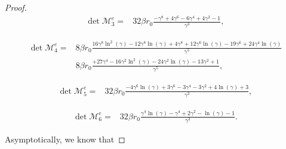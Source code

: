 \documentclass[11pt,letterpaper]{amsart}
\newcommand{\mM}{\mathcal{M}}
\theoremstyle{definition}
\theoremstyle{remark}
\numberwithin{equation}{section}
\begin{document}
\begin{proof}
\begin{equation}
    \begin{split}
        \det \mM^e_3=&32 \beta r_0\frac{- \gamma^8 + 4 \gamma^6 - 6 \gamma^4  + 4 \gamma^2  - 1}{\gamma^3},
    \end{split}
\end{equation}

\begin{equation}
    \begin{split}
        \det \mM^e_4=&8 \beta r_0\frac{16 \gamma^8 \ln^2(\gamma) - 12 \gamma^8 \ln(\gamma) + 4 \gamma^8 + 12 \gamma^6 \ln(\gamma) - 19 \gamma^6 + 24 \gamma^4  \ln(\gamma) }{\gamma^5}\\
        &8 \beta r_0\frac{+ 27 \gamma^4 - 16 \gamma^2 \ln^2(\gamma) - 24 \gamma^2 \ln(\gamma) - 13 \gamma^2 + 1}{\gamma^5},
    \end{split}
\end{equation}

\begin{equation}
    \begin{split}
       \det \mM^e_5=& 32\beta r_0\frac{-4 \gamma^6 \ln(\gamma) + 3 \gamma^6 - 3  \gamma^4 - 3  \gamma^2 + 4  \ln(\gamma) + 3 }{\gamma^3},
    \end{split}
\end{equation}

\begin{equation}
    \begin{split}
        \det \mM^e_6=&32 \beta r_0\frac{ \gamma^4 \ln(\gamma) -  \gamma^4 + 2 \gamma^2  -  \ln(\gamma) - 1}{\gamma^3}.
    \end{split}
\end{equation}

Asymptotically, we know that



\end{proof}
\end{document}
